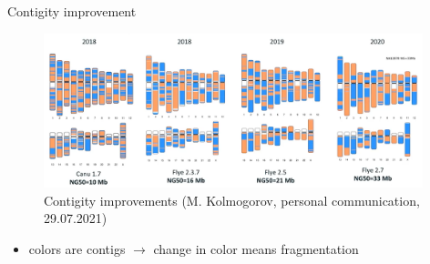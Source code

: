 \documentclass{beamer}
\begin{document}
  \begin{frame}{Contigity improvement}
    \begin{figure}
      \includegraphics[width=11cm]{presentation/images/contigity_improvement.png}
      \caption*{Contigity improvements (M. Kolmogorov, personal communication, 29.07.2021)}
      \label{fig:contig_improvements}
    \end{figure}
    \begin{itemize}
      \item colors are contigs $\rightarrow$ change in color means fragmentation
    \end{itemize}
  \end{frame}
\end{document}

